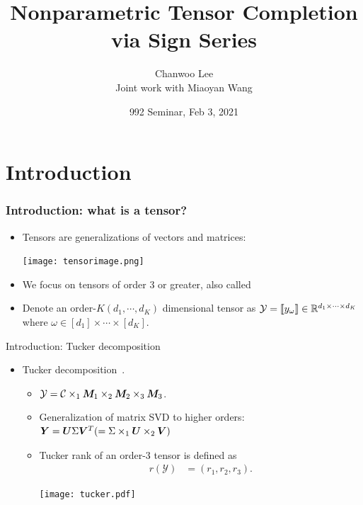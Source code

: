 \documentclass[10pt, mathserif]{beamer} %
\title{Nonparametric Tensor Completion via Sign Series}
\author{Chanwoo Lee\\ Joint work with Miaoyan Wang}
\institute{\scriptsize Department of Statistics \\University of Wisconsin - Madison}
\date{\small{992 Seminar, Feb 3, 2021}}
\theoremstyle{definition}
\theoremstyle{plain}
\begin{document}
\renewcommand{\raggedright}{\leftskip=0pt \rightskip=0pt plus 0cm}

\begin{frame}[plain]{}{}
\titlepage
\end{frame}



\section{Introduction}
\begin{frame}[label = slide1]
    \frametitle{Introduction: what is a tensor?}
    \begin{itemize}
        \item Tensors are generalizations of vectors and matrices:
        \begin{center}
            \texttt{[image: tensorimage.png]}
        \end{center}
         \item We focus on tensors of order 3 or greater, also called {\color{red}{higher-order tensors.} }
        \item Denote an order-$K (d_1,\cdots,d_K)$ dimensional tensor as $\mathcal{Y} = \llbracket y_\omega \rrbracket\in\mathbb{R}^{d_1\times\cdots\times d_K}$ \\
        where $\omega \in [d_1]\times \cdots\times [d_K].$
    \end{itemize}
\end{frame}





\begin{frame}{Introduction: Tucker decomposition}
\begin{itemize}
    \item Tucker decomposition~\citep{de2000multilinear}.
    \begin{itemize}
    \item $\mathcal{Y} = \mathcal{C}\times_1 \bm M_1\times_2 \bm M_2 \times_3 \bm M_3$.
    \item Generalization of matrix SVD to higher orders: $\bm Y = \bm{U}\Sigma\bm{V}^T (=\Sigma\times_1\bm{U}\times_2\bm{V})$
    \item Tucker rank of an order-3 tensor is defined as
    \vspace{-0.3cm}
    \begin{align*}
    r(\mathcal{Y}) &= (r_1,r_2,r_3).
    \end{align*}
   
    \begin{center}
    \texttt{[image: tucker.pdf]}
    \end{center}
    \end{itemize}
\end{itemize}
\end{frame}
\end{document}
